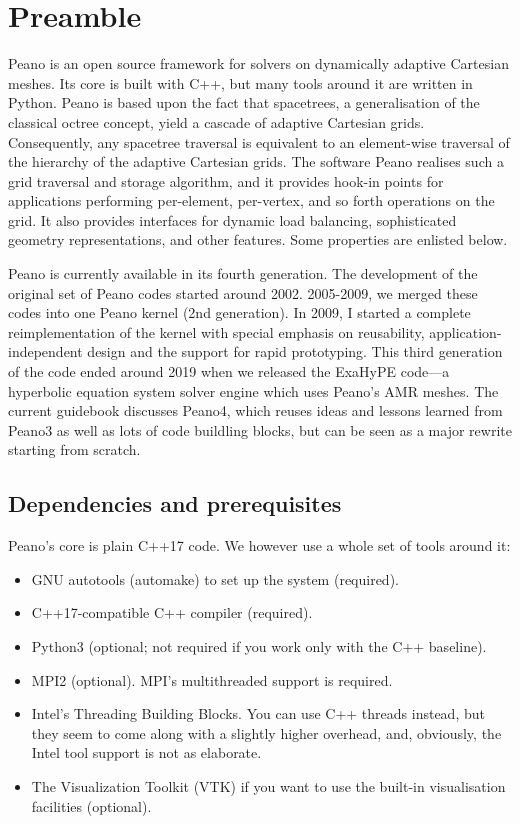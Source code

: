 \chapter{Preamble}


Peano is an open source framework for solvers on dynamically adaptive
Cartesian meshes.
Its core is built with C++, but many tools around it are written in Python.
Peano is based upon the fact that spacetrees, a generalisation of the classical octree concept, yield a cascade of adaptive Cartesian grids. Consequently, any spacetree traversal is equivalent to an element-wise traversal of the hierarchy of the adaptive Cartesian grids. The software Peano realises such a grid traversal and storage algorithm, and it provides hook-in points for applications performing per-element, per-vertex, and so forth operations on the grid. It also provides interfaces for dynamic load balancing, sophisticated geometry representations, and other features. Some properties are enlisted below.

Peano is currently available in its fourth generation. 
The development of the original set of Peano codes started around 2002.
2005-2009, we merged these codes into one Peano kernel (2nd generation). 
In 2009, I started a complete reimplementation of the kernel with special
emphasis on reusability, application-independent design and the support for rapid prototyping. 
This third generation of the code ended around 2019 when we released the
ExaHyPE code---a hyperbolic equation system solver engine which uses Peano's
AMR meshes.
The current guidebook discusses Peano4, which reuses ideas and lessons learned
from Peano3 as well as lots of code buildling blocks, but can be seen as a
major rewrite starting from scratch.


\section*{Dependencies and prerequisites}

Peano's core is plain C++17 code. 
We however use a whole set of tools around it:

\begin{itemize}
  \item GNU autotools (automake) to set up the system (required).
  \item C++17-compatible C++ compiler (required).
  \item Python3 (optional; not required if you work only with the C++
  baseline).
  \item MPI2 (optional). MPI's multithreaded support is required.
  \item Intel's Threading Building Blocks. You can use C++ threads instead,
  but they seem to come along with a slightly higher overhead, and, obviously,
  the Intel tool support is not as elaborate.
  \item The Visualization Toolkit (VTK) if you want to use the built-in
  visualisation facilities (optional).
\end{itemize}


